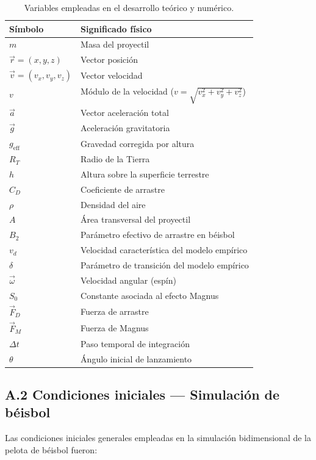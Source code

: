 \documentclass[11pt,a4paper]{article}
\begin{document}
\begin{table}[H]
\centering
\begin{tabular}{ll}
\toprule
Símbolo & Significado físico \\
\midrule
$m$ & Masa del proyectil \\
$\vec{r}=(x,y,z)$ & Vector posición \\
$\vec{v}=(v_x,v_y,v_z)$ & Vector velocidad \\
$v$ & Módulo de la velocidad ($v=\sqrt{v_x^2+v_y^2+v_z^2}$) \\
$\vec{a}$ & Vector aceleración total \\
$\vec{g}$ & Aceleración gravitatoria \\
$g_{\text{eff}}$ & Gravedad corregida por altura \\
$R_T$ & Radio de la Tierra \\
$h$ & Altura sobre la superficie terrestre \\
$C_D$ & Coeficiente de arrastre \\
$\rho$ & Densidad del aire \\
$A$ & Área transversal del proyectil \\
$B_2$ & Parámetro efectivo de arrastre en béisbol \\
$v_d$ & Velocidad característica del modelo empírico \\
$\delta$ & Parámetro de transición del modelo empírico \\
$\vec{\omega}$ & Velocidad angular (espín) \\
$S_0$ & Constante asociada al efecto Magnus \\
$\vec{F}_D$ & Fuerza de arrastre \\
$\vec{F}_M$ & Fuerza de Magnus \\
$\Delta t$ & Paso temporal de integración \\
$\theta$ & Ángulo inicial de lanzamiento \\
\bottomrule
\end{tabular}
\caption{Variables empleadas en el desarrollo teórico y numérico.}
\end{table}

\subsection*{A.2 Condiciones iniciales — Simulación de béisbol}

Las condiciones iniciales generales empleadas en la simulación bidimensional de la pelota de béisbol fueron:
\end{document}
